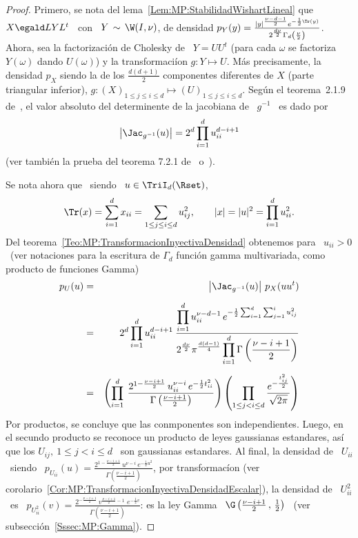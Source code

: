 \begin{proof}
  Primero, se nota del lema~\ref{Lem:MP:StabilidadWishartLineal} que \ $X \egald
  L  Y  L^t$  \  con  \  $Y  \, \sim  \,  \W(I,\nu)$,  de  densidad  $p_Y(y)  =
  \frac{|y|^{\frac{\nu-d-1}{2}}    e^{-\frac12    \Tr(y)}}{2^{\frac{d   \nu}{2}}
    \Gamma_d\left(  \frac{\nu}{2} \right)}$.  Ahora, sea  la  factorizaci\'on de
  Cholesky de  \ $Y =  U U^t$ (\ie  para cada $\omega$ se  factoriza $Y(\omega)$
  dando  $U(\omega)$)   y  la  transformaci\'ion   $g:  Y  \mapsto   U$.   M\'as
  precisamente,  la  densidad  $p_X$   siendo  la  de  los  $\frac{d  (d+1)}{2}$
  componentes diferentes  de $X$ (parte  triangular inferior), $g: (X)_{1  \le j
    \le i \le d} \mapsto (U)_{1 \le  j \le i \le d}$.
  Seg\'un el  teorema~2.1.9 de~\cite{Mui82}, el valor  absoluto del determinente
  de la jacobiana de \ $g^{-1}$ \ es dado por
  \[
  \left| \Jac_{g^{-1}}(u) \right| = 2^d \prod_{i=1}^d u_{ii}^{d-i+1}
  \]
  (ver tambi\'en la prueba del teorema 7.2.1 de~\cite{And03} o~\cite[Prop.~2.22]{BilBre99}).
  
  Se nota ahora que \ siendo \ $u \in \TriI_d(\Rset)$,
  \[
  \Tr(x) =  \sum_{i=1}^d x_{ii}  = \sum_{1 \le j \le i \le d} u_{ij}^2, \qquad
  |x| = |u|^2 = \prod_{i=1}^d u_{ii}^2.
  \]
  Del  teorema~\ref{Teo:MP:TransformacionInyectivaDensidad}   obtenemos  para  \
  $u_{ii}  > 0$ \  (ver notaciones  para la  escritura de  $\Gamma_d$ funci\'on
  gamma multivariada, como producto de funciones Gamma)
  \begin{eqnarray*}
  p_U(u) & = &\left| \Jac_{g^{-1}}(u) \right| \,  p_X(u u^t) \\[2mm]
  & = & 2^d \prod_{i=1}^d u_{ii}^{d-i+1} \: \frac{\displaystyle \prod_{i=1}^d
  u_{ii}^{\nu-d-1} \, e^{ -\frac12 \sum_{i=1}^d \sum_{j=1}^i  u_{ij}^2}}{\displaystyle
  2^{\frac{d \nu}{2}} \pi^{\frac{d (d-1)}{4}} \prod_{i=1}^d \Gamma\left(
  \frac{\nu-i+1}{2} \right)}\\[2mm]
  & = & \left( \prod_{i=1}^d \: \frac{2^{1 - \frac{\nu-i+1}{2}} \,
  u_{ii}^{\nu-i} \, e^{-\frac12 t_{ii}^2}}{\Gamma\left( \frac{\nu-i+1}{2} \right)}
  \right) \left( \prod_{1 \le j < i \le d} \frac{\displaystyle
  e^{-\frac{t_{ij}^2}{2}}}{\sqrt{2 \pi}} \right)
  \end{eqnarray*}
  Por productos, se concluye que  las conmponentes son independientes. Luego, en
  el secundo  producto se  reconoce un producto  de leyes  gaussianas estandares,
  as\'i que los  $U_{ij}, \: 1 \le j  < i \le d$ \ son  gaussianas estandares. Al
  final,   la   densidad  de   \   $U_{ii}$   \   siendo  \   $p_{U_{ii}}(u)   =
  \frac{2^{1-\frac{\nu-i+1}{2}}  \, u^{\nu-i} \,  e^{-\frac12 u^2}}{\Gamma\left(
      \frac{\nu-i+1}{2}      \right)}$,      por      transformac\'ion      (ver
  corolario~\ref{Cor:MP:TransformacionInyectivaDensidadEscalar}), la densidad de
  \  $U_{ii}^2$  \  es  \  $p_{U_{ii}^2}(v)  =  \frac{2^{-\frac{\nu-i+1}{2}}  \,
    v^{\frac{\nu-i+1}{2}-1} \, \, e^{-\frac12 v}}{\Gamma\left( \frac{\nu-i+1}{2}
    \right)}$: es  la ley  Gamma \ $\G\left(  \frac{\nu-i+1}{2} \, ,  \, \frac12
  \right)$ \ (ver subsecci\'on~\ref{Sssec:MP:Gamma}).
\end{proof}
